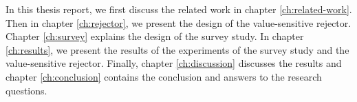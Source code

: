 
%
In this thesis report, we first discuss the related work in chapter \ref{ch:related-work}.
%
Then in chapter \ref{ch:rejector}, we present the design of the value-sensitive rejector.
%
Chapter \ref{ch:survey} explains the design of the survey study.
%
In chapter \ref{ch:results}, we present the results of the experiments of the survey study and the value-sensitive rejector.
%
Finally, chapter \ref{ch:discussion} discusses the results and chapter \ref{ch:conclusion} contains the conclusion and answers to the research questions.
